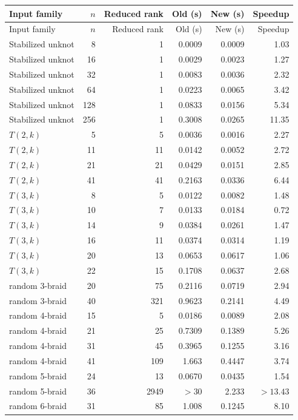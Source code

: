\documentclass[11pt]{article}
\theoremstyle{remark}\newtheorem{remark}[theorem]{Remark}
\begin{document}
\small
\begin{longtable}{@{}lrrrrr@{}}
\toprule
Input family & $n$ & Reduced rank & Old (s) & New (s) & Speedup\\
\midrule
\endfirsthead
\toprule
Input family & $n$ & Reduced rank & Old (s) & New (s) & Speedup\\
\midrule
\endhead
\bottomrule\endfoot
Stabilized unknot & 8 & 1 & 0.0009 & 0.0009 & 1.03\\
Stabilized unknot & 16 & 1 & 0.0029 & 0.0023 & 1.27\\
Stabilized unknot & 32 & 1 & 0.0083 & 0.0036 & 2.32\\
Stabilized unknot & 64 & 1 & 0.0223 & 0.0065 & 3.42\\
Stabilized unknot & 128 & 1 & 0.0833 & 0.0156 & 5.34\\
Stabilized unknot & 256 & 1 & 0.3008 & 0.0265 & 11.35\\
$T(2,k)$ & 5 & 5 & 0.0036 & 0.0016 & 2.27\\
$T(2,k)$ & 11 & 11 & 0.0142 & 0.0052 & 2.72\\
$T(2,k)$ & 21 & 21 & 0.0429 & 0.0151 & 2.85\\
$T(2,k)$ & 41 & 41 & 0.2163 & 0.0336 & 6.44\\
$T(3,k)$ & 8 & 5 & 0.0122 & 0.0082 & 1.48\\
$T(3,k)$ & 10 & 7 & 0.0133 & 0.0184 & 0.72\\
$T(3,k)$ & 14 & 9 & 0.0384 & 0.0261 & 1.47\\
$T(3,k)$ & 16 & 11 & 0.0374 & 0.0314 & 1.19\\
$T(3,k)$ & 20 & 13 & 0.0653 & 0.0617 & 1.06\\
$T(3,k)$ & 22 & 15 & 0.1708 & 0.0637 & 2.68\\
random 3-braid & 20 & 75 & 0.2116 & 0.0719 & 2.94\\
random 3-braid & 40 & 321 & 0.9623 & 0.2141 & 4.49\\
random 4-braid & 15 & 5 & 0.0186 & 0.0089 & 2.08\\
random 4-braid & 21 & 25 & 0.7309 & 0.1389 & 5.26\\
random 4-braid & 31 & 45 & 0.3965 & 0.1255 & 3.16\\
random 4-braid & 41 & 109 & 1.663 & 0.4447 & 3.74\\
random 5-braid & 24 & 13 & 0.0670 & 0.0435 & 1.54\\
random 5-braid & 36 & 2949 & $>30$ & 2.233 & $>13.43$\\
random 6-braid & 31 & 85 & 1.008 & 0.1245 & 8.10\\
\end{longtable}
\normalsize
\end{document}
